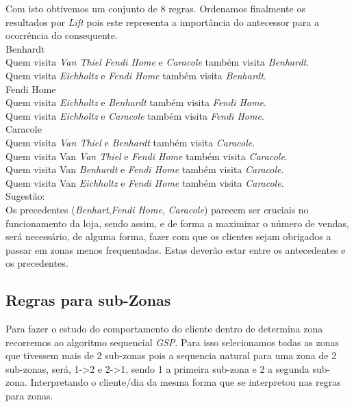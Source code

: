 \documentclass[a4paper]{article}
\begin{document}
Com isto obtivemos um conjunto de 8 regras. Ordenamos finalmente os resultados por \textit{Lift} pois este representa a importância do antecessor para a ocorrência do consequente.
\\
Benhardt %
\\
Quem visita \textit{Van Thiel} \textit{Fendi Home} e \textit{Caracole} também visita \textit{Benhardt}.\\
Quem visita \textit{Eichholtz} e \textit{Fendi Home} também visita \textit{Benhardt}.
\\
Fendi Home
\\
Quem visita \textit{Eichholtz} e \textit{Benhardt} também visita \textit{Fendi Home}.\\
Quem visita \textit{Eichholtz} e \textit{Caracole} também visita \textit{Fendi Home}.\\
Caracole
\\
Quem visita \textit{Van Thiel} e \textit{Benhardt} também visita \textit{Caracole}.\\
Quem visita Van \textit{Van Thiel} e \textit{Fendi Home} também visita \textit{Caracole}.\\
Quem visita Van \textit{Benhardt} e \textit{Fendi Home} também visita \textit{Caracole}.\\
Quem visita Van \textit{Eichholtz} e \textit{Fendi Home} também visita \textit{Caracole}.\\

Sugestão:\\
Os precedentes (\textit{Benhart},\textit{Fendi Home}, \textit{Caracole}) parecem ser cruciais no funcionamento da loja, sendo assim, e de forma a maximizar o número de vendas, será necessário, de alguma forma, fazer com que os clientes sejam obrigados a passar em zonas menos frequentadas. Estas deverão estar entre os antecedentes e os precedentes.
 
\subsection{Regras para sub-Zonas}

Para fazer o estudo do comportamento do cliente dentro de determina zona recorremos ao algoritmo sequencial \textit{GSP}. Para isso selecionamos todas as zonas que tivessem mais de 2 sub-zonas pois a sequencia natural para uma  zona de 2 sub-zonas, será, 1->2 e 2->1, sendo 1 a primeira sub-zona e 2 a segunda sub-zona. Interpretando o cliente/dia da mesma forma que se interpretou nas regras para zonas.
\end{document}
